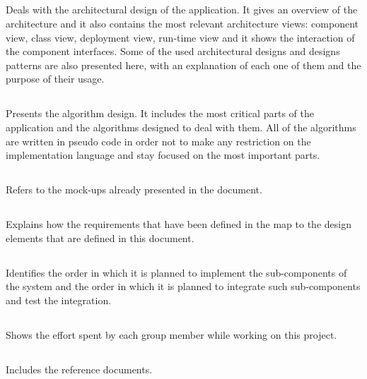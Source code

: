         \subsection*{}
        Deals with the architectural design of the application. It gives an overview of the architecture and it also contains the most relevant architecture views: component view, class view, deployment view, run-time view and it shows the interaction of the component interfaces. Some of the used architectural designs and designs patterns are also presented here, with an explanation of each one of them and the purpose of their usage.
        
        \subsection*{}
        Presents the algorithm design. It includes the most critical parts of the application and the algorithms designed to deal with them. All of the algorithms are written in pseudo code in order not to make any restriction on the implementation language and stay focused on the most important parts.
        
        \subsection*{}
        Refers to the mock-ups already presented in the \RASD document.
        
        \subsection*{}
        Explains how the requirements that have been defined in the \RASD map to the design elements that are defined in this document.
    
        \subsection*{}
        Identifies the order in which it is planned to implement the sub-components of the system and the order in which it is planned to integrate such sub-components and test the integration.
        
        \subsection*{}
        Shows the effort spent by each group member while working on this project.
    
        \subsection*{}
        Includes the reference documents.